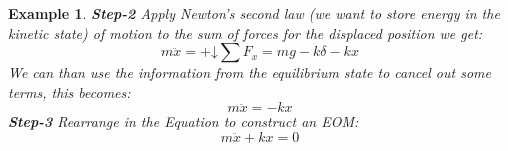 \documentclass[12pt,letter]{article}
\newtheorem{ex}{Example}
\numberwithin{ex}{section} %
\newenvironment{example}{\begin{mdframed}[middlelinewidth=0.5mm]\begin{ex}\normalfont}{\end{ex}\end{mdframed}}
\numberwithin{re}{section} %
\newcommand*\downplus{%
  \mathbin{+\mathord\downarrow}}								%
\begin{document}
\begin{example}
			\noindent \textbf{Step-2} Apply Newton's second law (we want to store energy in the kinetic state) of motion to the sum of forces for the displaced position we get: 		
			\begin{equation}
				m\ddot{x} = \downplus \sum F_x =mg -k\delta -kx
			\end{equation}
			We can than use the information from the equilibrium state to cancel out some terms, this becomes:
			\begin{equation}
				m\ddot{x} = -kx
			\end{equation}				
			\textbf{Step-3} Rearrange in the Equation to construct an EOM: 					
			\begin{equation}
				m\ddot{x} + kx = 0
			\end{equation}			
		\end{example}		
		
\end{document}
